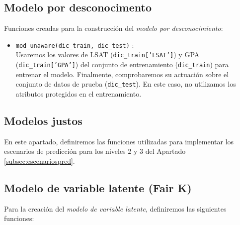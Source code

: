 \documentclass[oneside,openright,titlepage,numbers=noenddot,openany,headinclude,footinclude=true,
cleardoublepage=empty,abstractoff,BCOR=5mm,paper=a4,fontsize=12pt,main=spanish]{scrreprt}
\begin{document}
\subsection*{Modelo por desconocimento}

Funciones creadas para la construcción del \textit{modelo por desconocimiento}:

\begin{itemize}
    \item \texttt{mod\_unaware(dic\_train, dic\_test)} :\\
    Usaremos los valores de LSAT (\texttt{dic\_train['LSAT']}) y GPA (\texttt{dic\_train['GPA']}) del conjunto de entrenamiento (\texttt{dic\_train}) para entrenar el modelo. Finalmente, comprobaremos su actuación sobre el conjunto de datos de prueba (\texttt{dic\_test}). En este caso, no utilizamos los atributos protegidos en el entrenamiento.
\end{itemize}

\subsection{Modelos justos}

En este apartado, definiremos las funciones utilizadas para implementar los escenarios de predicción para los niveles 2 y 3 del Apartado \ref{subsec:escenariospred}.

\subsection*{Modelo de variable latente (Fair K)}

Para la creación del \textit{modelo de variable latente}, definiremos las siguientes funciones:
\end{document}

